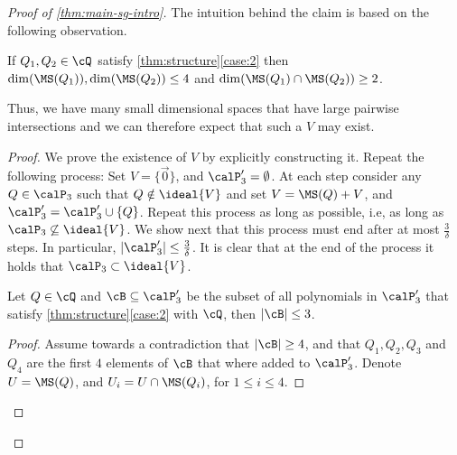 \begin{proof}[Proof of \autoref{thm:main-sg-intro}]
The intuition  behind the claim is based on the following observation.

\begin{observation}\label{rem:4-2-dim}
If $Q_1,Q_2 \in \cQ$ satisfy \autoref{thm:structure}\ref{case:2} then $\dim(\MS(Q_1)), \dim(\MS(Q_2)) \leq 4$ and $\dim(\MS(Q_1)\cap\MS(Q_2)) \geq 2$. 
\end{observation}

Thus, we have many small dimensional spaces that have large pairwise intersections and we can therefore expect that such a $V$ may exist.


\begin{proof}
We prove the existence of $V$ by explicitly constructing it.
Repeat the following process: Set $V = \{\vec{0}\}$, and $\calP'_3=\emptyset$. At each step consider any $Q \in \calP_3$ such that $Q\notin \ideal{V}$ and set $V =\MS(Q) + V$, and $\calP'_3=\calP'_3 \cup \{Q\}$. Repeat this process as long as possible, i.e, as long as $\calP_3 \not \subseteq \ideal{V}$. We  show next that this process must end after at most $\frac{3}{\delta}$ steps. In particular, $|\calP'_3| \leq \frac{3}{\delta}$. It is clear that at the end of the process it holds that $\calP_3 \subset \ideal{V}$.





\begin{claim}\label{cla:3-case3}
Let $Q\in \cQ$ and $\cB\subseteq \calP'_3$ be the subset of all polynomials in $\calP'_3$ that satisfy \autoref{thm:structure}\ref{case:2} with $\cQ$, then $|\cB| \leq 3$.
\end{claim}

\begin{proof}
Assume towards a contradiction that $|\cB| \geq 4$, and that $Q_1,Q_2,Q_3$ and $Q_4$ are the first $4$ elements of $\cB$ that where added to $\calP'_3$. Denote $U=\MS(Q)$, and  $U_i = U\cap \MS(Q_i)$, for $1\leq i \leq 4$.


\end{proof}
\end{proof}
\end{proof}
